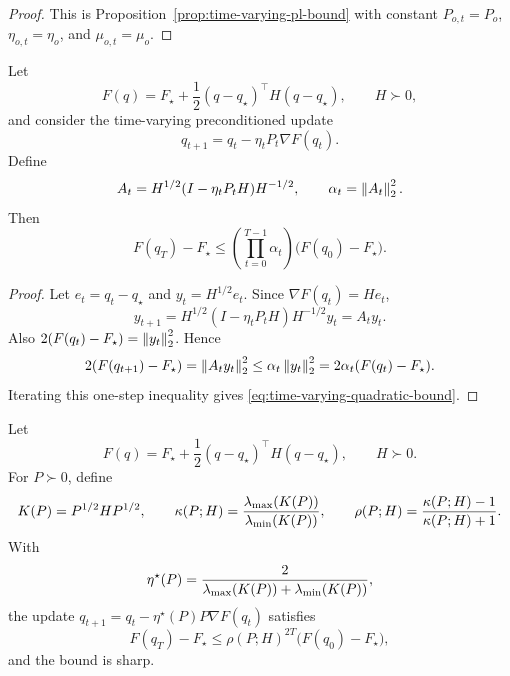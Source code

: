 \begin{proof}
This is Proposition~\ref{prop:time-varying-pl-bound} with constant
$P_{o,t}=P_o$, $\eta_{o,t}=\eta_o$, and $\mu_{o,t}=\mu_o$.
\end{proof}

\begin{proposition}
\label{prop:time-varying-quadratic-bound}
Let
\begin{equation}
    F(q)=F_\star+\frac{1}{2}(q-q_\star)^\top H(q-q_\star),
    \qquad H\succ0,
\end{equation}
and consider the time-varying preconditioned update
\begin{equation}
    q_{t+1}=q_t-\eta_t P_t\nabla F(q_t).
\end{equation}
Define
\begin{equation}
    A_t=H^{1/2}(I-\eta_tP_tH)H^{-1/2},
    \qquad
    \alpha_t=\left\lVert A_t \right\rVert_2^2 .
    \label{eq:time-varying-quadratic-alpha}
\end{equation}
Then
\begin{equation}
    F(q_T)-F_\star
    \leq
    \left(\prod_{t=0}^{T-1}\alpha_t\right)
    \bigl(F(q_0)-F_\star\bigr).
    \label{eq:time-varying-quadratic-bound}
\end{equation}
\end{proposition}

\begin{proof}
Let $e_t=q_t-q_\star$ and $y_t=H^{1/2}e_t$.  Since
$\nabla F(q_t)=He_t$,
\begin{equation}
    y_{t+1}=H^{1/2}(I-\eta_tP_tH)H^{-1/2}y_t=A_ty_t.
\end{equation}
Also $2(F(q_t)-F_\star)=\left\lVert y_t \right\rVert_2^2$.  Hence
\begin{equation}
    2(F(q_{t+1})-F_\star)=\left\lVert A_ty_t \right\rVert_2^2
    \leq \alpha_t\left\lVert y_t \right\rVert_2^2
    =2\alpha_t(F(q_t)-F_\star).
\end{equation}
Iterating this one-step inequality gives \eqref{eq:time-varying-quadratic-bound}.
\end{proof}

\begin{lemma}
\label{lem:preconditioned-contraction}
Let
\begin{equation}
    F(q)=F_\star+\frac{1}{2}(q-q_\star)^\top H(q-q_\star),
    \qquad H\succ0.
\end{equation}
For $P\succ0$, define
\begin{equation}
    K(P)=P^{1/2}HP^{1/2},
    \qquad
    \kappa(P;H)=\frac{\lambda_{\max}(K(P))}{\lambda_{\min}(K(P))},
    \qquad
    \rho(P;H)=\frac{\kappa(P;H)-1}{\kappa(P;H)+1}.
    \label{eq:quadratic-rho-def}
\end{equation}
With
\begin{equation}
    \eta^\star(P)=\frac{2}{\lambda_{\max}(K(P))+\lambda_{\min}(K(P))},
\end{equation}
the update $q_{t+1}=q_t-\eta^\star(P)P\nabla F(q_t)$ satisfies
\begin{equation}
    F(q_T)-F_\star
    \leq
    \rho(P;H)^{2T}\bigl(F(q_0)-F_\star\bigr),
    \label{eq:upper-contraction}
\end{equation}
and the bound is sharp.
\end{lemma}

